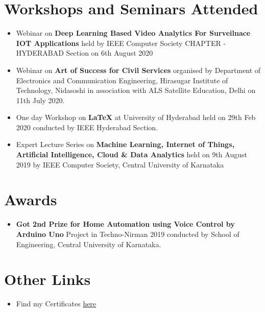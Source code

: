 \documentclass[]{article}
\begin{document}
    \section*{Workshops and Seminars Attended}
    \begin{itemize}
        
        \item Webinar on\textbf{ Deep Learning Based Video Analytics For Surveilnace IOT Applications} held by IEEE Computer Society CHAPTER -HYDERABAD Section on 6th August 2020
        \item Webinar on \textbf{Art of Success for Civil Services} organised by Department of Electronics and Communication Engineering, Hirasugar Institute of Technology, Nidasoshi in association with ALS Satellite Education, Delhi on 11th July 2020.
        \item One day Workshop on \textbf{LaTeX} at University of Hyderabad held on 29th Feb 2020 conducted by IEEE Hyderabad Section.
        \item Expert Lecture Series on \textbf{Machine Learning, Internet of Things, Artificial Intelligence, Cloud \& Data Analytics}
        held on 9th August 2019 by IEEE Computer Society, Central University of Karnataka
    \end{itemize}
    \section*{Awards}
    \begin{itemize}
        \item \textbf{Got 2nd Prize for Home Automation using Voice Control by Arduino Uno} Project in Techno-Nirman 2019
        conducted by School of Engineering, Central University of Karnataka.
    \end{itemize}
    \section*{Other Links}
    \begin{itemize}
    \item Find my Certificates \href{https://drive.google.com/drive/folders/1afmjGeQ6c10q58FP6xpgcYjkM3Um7R69?usp=sharing}{here}
    
    \end{itemize}
    
    
\end{document}
